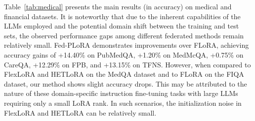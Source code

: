 \documentclass{article} %
\begin{document}
Table~\ref{tab:medical} presents the main results (in accuracy) on medical and financial datasets. It is noteworthy that due to the inherent capabilities of the LLMs employed and the potential domain shift between the training and test sets, the observed performance gaps among different federated methods remain relatively small. Fed-PLoRA demonstrates improvements over FLoRA, achieving accuracy gains of +14.40\% on PubMedQA, +1.20\% on MedMcQA, +0.75\% on CareQA, +12.29\% on FPB, and +13.15\% on TFNS. However, when compared to FlexLoRA and HETLoRA on the MedQA dataset and to FLoRA on the FIQA dataset, our method shows slight accuracy drops. This may be attributed to the nature of these domain-specific instruction fine-tuning tasks with large LLMs requiring only a small LoRA rank. In such scenarios, the initialization noise in FlexLoRA and HETLoRA can be relatively small.
\end{document}
